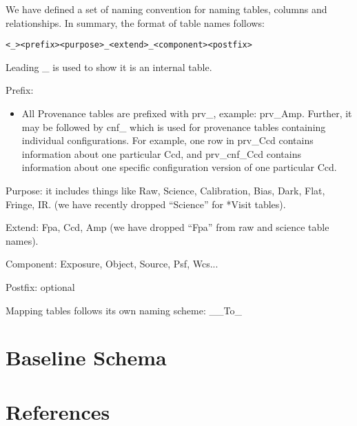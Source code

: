 \documentclass[DM,toc]{lsstdoc}
\begin{document}
We have defined a set of naming convention for naming tables, columns and relationships. In summary, the format of table names follows: 

\texttt{<\_><prefix><purpose>\_<extend>\_<component><postfix>}

Leading \_ is used to show it is an internal table.

Prefix:
\begin{itemize}
  \item All Provenance tables are prefixed with prv\_, example: prv\_Amp. Further, it may be followed by cnf\_ which is used for provenance tables containing individual configurations. For example, one row in prv\_Ccd contains information about one particular Ccd, and prv\_cnf\_Ccd contains information about one specific configuration version of one particular Ccd.
\end{itemize}

Purpose: it includes things like Raw, Science, Calibration, Bias, Dark, Flat, Fringe, IR. (we have recently dropped ``Science'' for *Visit tables).

Extend: Fpa, Ccd, Amp (we have dropped ``Fpa'' from raw and science table names).

Component: Exposure, Object, Source, Psf, Wcs...

Postfix: optional

Mapping tables follows its own naming scheme: \_<table X name>\_To\_<table Y name>


\section{Baseline Schema}



\appendix
\section{References} \label{sec:bib}


%
\end{document}
